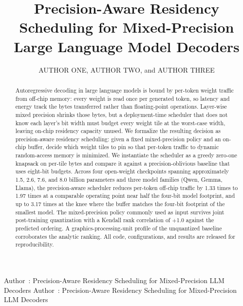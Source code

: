 \documentclass{ieeeaccess}
\begin{document}

\title{Precision-Aware Residency Scheduling for Mixed-Precision Large Language Model Decoders}
\author{\uppercase{Author One}, \uppercase{Author Two},
        and \uppercase{Author Three}}
\address[1]{Department of Computer Science and Engineering, Ewha Womans
University, Seoul, Republic of Korea (corresponding author e-mail:
{authorone}@ewha.ac.kr)}

\markboth
{Author~\headeretal: Precision-Aware Residency Scheduling for Mixed-Precision LLM Decoders}
{Author~\headeretal: Precision-Aware Residency Scheduling for Mixed-Precision LLM Decoders}


\begin{abstract}
Autoregressive decoding in large language models is bound by per-token
weight traffic from off-chip memory: every weight is read once per
generated token, so latency and energy track the bytes transferred
rather than floating-point operations. Layer-wise mixed precision
shrinks those bytes, but a deployment-time scheduler that does not
know each layer's bit width must budget every weight tile at the
worst-case width, leaving on-chip residency capacity unused. We
formalize the resulting decision as precision-aware residency
scheduling: given a fixed mixed-precision policy and an on-chip
buffer, decide which weight tiles to pin so that per-token traffic to
dynamic random-access memory is minimized. We instantiate the
scheduler as a greedy zero-one knapsack on per-tile bytes and compare
it against a precision-oblivious baseline that uses eight-bit budgets.
Across four open-weight checkpoints spanning approximately 1.5, 2.6,
7.6, and 8.0 billion parameters and three model families (Qwen, Gemma,
Llama), the precision-aware scheduler reduces per-token off-chip
traffic by 1.33 times to 1.97 times at a comparable operating point
near half the four-bit model footprint, and up to 3.17 times at the
knee where the buffer matches the four-bit footprint of the smallest
model. The mixed-precision policy commonly used as input
survives joint post-training quantization with a Kendall rank
correlation of $+$1.0 against the predicted ordering. A
graphics-processing-unit profile of the unquantized baseline
corroborates the analytic ranking. All code, configurations, and
results are released for reproducibility.
\end{abstract}
\end{document}
